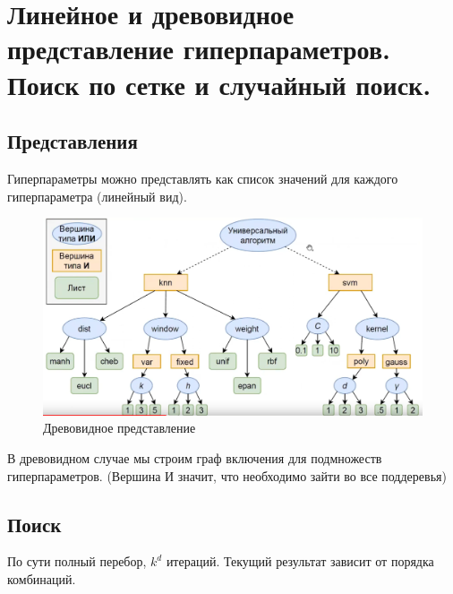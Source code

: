 \section{Линейное и древовидное представление гиперпараметров. Поиск по сетке и случайный поиск.}

\subsection*{Представления}

Гиперпараметры можно представлять как список значений для
каждого гиперпараметра (линейный вид).

\begin{figure}[H]
    \centering
    \includegraphics[scale=.4]{images/hp_tree}
    \caption{Древовидное представление}
\end{figure}

В древовидном случае мы строим граф включения для подмножеств
гиперпараметров. (Вершина И значит, что необходимо зайти во все
поддеревья) 

\subsection*{Поиск}


По сути полный перебор, $k^d$ итераций. Текущий результат зависит
от порядка комбинаций.

